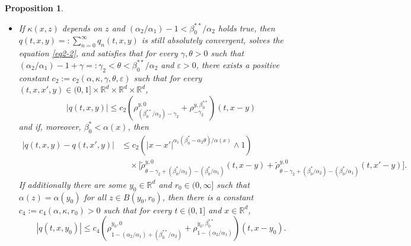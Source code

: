 \documentclass[a4paper,11pt]{amsart}
\renewcommand{\le}{\leqslant}
\newcommand{\R}{\mathds R}
\newcommand{\B}{\beta}
\newcommand{\K}{\kappa}
\newcommand{\A}{\alpha}
\newcommand{\G}{\gamma}
\newtheorem{proposition}[theorem]{Proposition}
\theoremstyle{definition}
\begin{document}
\begin{proposition}
\begin{itemize}
\item[(2)] If $\kappa(x,z)$ depends on $z$ and $({\A_2}/{\A_1})-1<{\B^{**}_0}/{\A_2}$ holds true, then $q(t,x,y)=:\sum_{n=0}^{\infty}q_n(t,x,y)$ is
still absolutely convergent, solves the equation \eqref{eq2-2}, and satisfies that for every $\gamma,\theta>0$ such that $({\A_2}/{\A_1})-1+\gamma =:\G_2<\theta<{\B_0^{**}/\A_2}$ and
$\varepsilon>0$, there exists a positive constant $c_2:=c_2(\A,\K, \G,\theta,\varepsilon)$ such that for every $(t,x,x',y)\in (0,1]\times \R^d\times \R^d \times \R^d$,
\begin{equation}\label{p3-1-2}
|q(t,x,y)|\le c_2\left(\rho^{y,0}_{{(\B_0^{**}/\A_2)}-\G_2 }+\rho^{y,\B_0^{**}}_{-\G_2 }\right)(t,x-y)
\end{equation} and if, moreover, $\B_0^*<\A(x)$, then
\begin{equation}\label{p3-1-2a}
\begin{split}
 |q(t,x,y)-q(t,x',y)|
&\le c_2\left(|x-x'|^{{\A_1(\B_0^*-\A_2\theta)}/{\A(x)}}\wedge 1\right)\\
&\quad\times
\Big[\tilde \rho^{y,0}_{\theta-\gamma_2+(\B_0^{*}/\A_2)-(\B_0^*/\A_1)}(t,x-y)
+\tilde \rho^{y,0}_{\theta-\gamma_2
+(\B_0^{*}/\A_2)-(\B_0^*/\A_1)}(t,x'-y)\Big].
\end{split}
\end{equation}
If additionally there are some $y_0\in \R^d$ and $r_0\in(0,\infty]$ such that $\alpha(z)=\alpha(y_0)$ for all $z \in B(y_0,r_0)$, then there is a constant $c_4:=c_4(\A,\K, r_0)>0$ such that for every $t\in (0,1]$ and  $x \in \R^d$,
\begin{equation}\label{p3-1-2c}
|q(t,x,y_0)|\le c_4\left(\rho^{y_0,0}_{1-({\A_2}/{\A_1})+{(\B_0^{**}/\A_2)}}+\rho^{y_0,\B_0^{**}}_{1-({\A_2}/{\A_1})}\right)(t,x-y_0).
\end{equation}
\end{itemize}
\end{proposition}
\end{document}
